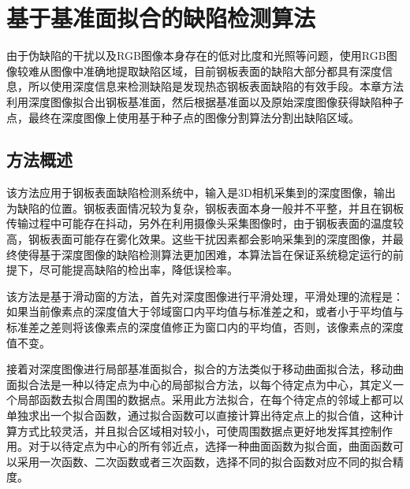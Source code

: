 ﻿%
%
%
%
%
%

\chapter{基于基准面拟合的缺陷检测算法}
由于伪缺陷的干扰以及RGB图像本身存在的低对比度和光照等问题，使用RGB图像较难从图像中准确地提取缺陷区域，目前钢板表面的缺陷大部分都具有深度信息，所以使用深度信息来检测缺陷是发现热态钢板表面缺陷的有效手段。本章方法利用深度图像拟合出钢板基准面，然后根据基准面以及原始深度图像获得缺陷种子点，最终在深度图像上使用基于种子点的图像分割算法分割出缺陷区域。
    \section{方法概述}
    该方法应用于钢板表面缺陷检测系统中，输入是3D相机采集到的深度图像，输出为缺陷的位置。钢板表面情况较为复杂，钢板表面本身一般并不平整，并且在钢板传输过程中可能存在抖动，另外在利用摄像头采集图像时，由于钢板表面的温度较高，钢板表面可能存在雾化效果。这些干扰因素都会影响采集到的深度图像，并最终使得基于深度图像的缺陷检测算法更加困难，本算法旨在保证系统稳定运行的前提下，尽可能提高缺陷的检出率，降低误检率。

    该方法是基于滑动窗的方法，首先对深度图像进行平滑处理，平滑处理的流程是：如果当前像素点的深度值大于邻域窗口内平均值与标准差之和，或者小于平均值与标准差之差则将该像素点的深度值修正为窗口内的平均值，否则，该像素点的深度值不变。

    接着对深度图像进行局部基准面拟合，拟合的方法类似于移动曲面拟合法，移动曲面拟合法是一种以待定点为中心的局部拟合方法，以每个待定点为中心，其定义一个局部函数去拟合周围的数据点。采用此方法拟合，在每个待定点的邻域上都可以单独求出一个拟合函数，通过拟合函数可以直接计算出待定点上的拟合值，这种计算方式比较灵活，并且拟合区域相对较小，可使周围数据点更好地发挥其控制作用。对于以待定点为中心的所有邻近点，选择一种曲面函数为拟合面，曲面函数可以采用一次函数、二次函数或者三次函数，选择不同的拟合函数对应不同的拟合精度。

